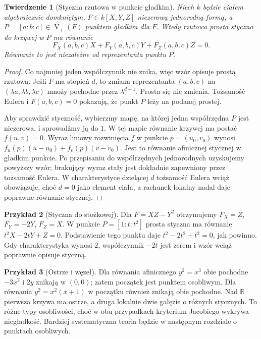\documentclass[11pt,a4paper,openany]{report}
\numberwithin{equation}{section}
\theoremstyle{plain}
\newtheorem{twierdzenie}{Twierdzenie}[section]
\theoremstyle{definition}
\newtheorem{przyklad}[twierdzenie]{Przykład}
\theoremstyle{remark}
\newcommand{\R}{\mathbb R}
\newcommand{\V}{\operatorname V}
\begin{document}
\begin{twierdzenie}[Styczna rzutowa w punkcie gładkim]
\label{tw:tangent-projective}
Niech $k$ będzie ciałem algebraicznie domkniętym,
$F\in k[X,Y,Z]$ niezerową jednorodną formą,
a $P=[a:b:c]\in\V_+(F)$ punktem gładkim dla $F$.
Wtedy rzutowa prosta styczna do krzywej w $P$ ma równanie
\[
 F_X(a,b,c)X+F_Y(a,b,c)Y+F_Z(a,b,c)Z=0.
\]
Równanie to jest niezależne od reprezentanta punktu $P$.
\end{twierdzenie}
\begin{proof}
Co najmniej jeden współczynnik nie znika, więc wzór
opisuje prostą rzutową. Jeśli $F$ ma stopień $d$,
to zmiana reprezentanta $(a,b,c)$ na
$(\lambda a,\lambda b,\lambda c)$ mnoży pochodne
przez $\lambda^{d-1}$. Prosta się nie zmienia.
Tożsamość Eulera i $F(a,b,c)=0$ pokazują,
że punkt $P$ leży na podanej prostej.

Aby sprawdzić styczność, wybierzmy mapę, na której jedna
współrzędna $P$ jest niezerowa, i sprowadźmy ją do $1$.
W tej mapie równanie krzywej ma postać $f(u,v)=0$.
Wyraz liniowy rozwinięcia $f$ w punkcie $p=(u_0,v_0)$
wynosi $f_u(p)(u-u_0)+f_v(p)(v-v_0)$.
Jest to równanie afinicznej stycznej w gładkim punkcie.
Po przepisaniu do współrzędnych jednorodnych uzyskujemy
powyższy wzór; brakujący wyraz stały jest dokładnie
zapewniony przez tożsamość Eulera. W charakterystyce
dzielącej $d$ tożsamość Eulera wciąż obowiązuje,
choć $d=0$ jako element ciała, a rachunek lokalny
nadal daje poprawne równanie stycznej.
\end{proof}

\begin{przyklad}[Styczna do stożkowej]
Dla $F=XZ-Y^2$ otrzymujemy $F_X=Z$, $F_Y=-2Y$,
$F_Z=X$. W punkcie $P=[1:t:t^2]$ prosta styczna ma
równanie $t^2X-2tY+Z=0$. Podstawienie tego punktu daje
$t^2-2t^2+t^2=0$, jak powinno. Gdy charakterystyka
wynosi $2$, współczynnik $-2t$ jest zerem i wzór
wciąż poprawnie opisuje styczną.
\end{przyklad}

\begin{przyklad}[Ostrze i węzeł]
Dla równania afinicznego $y^2=x^3$ obie pochodne
$-3x^2$ i $2y$ znikają w $(0,0)$; zatem początek
jest punktem osobliwym. Dla równania
$y^2=x^2(x+1)$ w początku również znikają obie pochodne.
Nad $\R$ pierwsza krzywa ma ostrze, a druga lokalnie
dwie gałęzie o różnych stycznych. To różne typy osobliwości,
choć w obu przypadkach kryterium Jacobiego wykrywa
niegładkość. Bardziej systematyczna teoria będzie
w następnym rozdziale o punktach osobliwych.
\end{przyklad}
\end{document}
